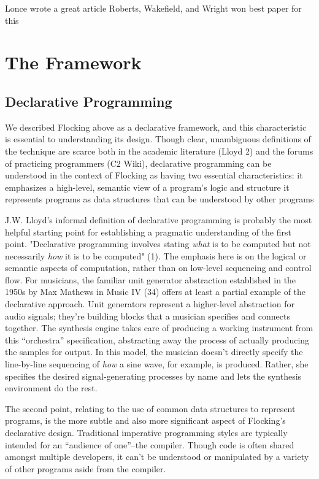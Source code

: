 \documentclass{article}
\begin{document}
Lonce wrote a great article \cite{DBLP:journals/comj/WyseS13}
Roberts, Wakefield, and Wright won best paper for this \cite{roberts_web_2013}


\section{The Framework}

\subsection{Declarative Programming}
We described Flocking above as a declarative framework, and this characteristic is essential to understanding its design. Though clear, unambiguous definitions of the technique are scarce both in the academic literature (Lloyd 2) and the forums of practicing programmers (C2 Wiki), declarative programming can be understood in the context of Flocking as having two essential characteristics:
it emphasizes a high-level, semantic view of a program’s logic and structure
it represents programs as data structures that can be understood by other programs

J.W. Lloyd's informal definition of declarative programming is probably the most helpful starting point for establishing a pragmatic understanding of the first point. "Declarative programming involves stating {\it what} is to be computed but not necessarily {\it how} it is to be computed" (1). The emphasis here is on the logical or semantic aspects of computation, rather than on low-level sequencing and control flow. For musicians, the familiar unit generator abstraction established in the 1950s by Max Mathews in Music IV (34) offers at least a partial example of the declarative approach. Unit generators represent a higher-level abstraction for audio signals; they're building blocks that a musician specifies and connects together. The synthesis engine takes care of producing a working instrument from this “orchestra” specification, abstracting away the process of actually producing the samples for output. In this model, the musician doesn't directly specify the line-by-line sequencing of {\it how} a sine wave, for example, is produced. Rather, she specifies the desired signal-generating processes by name and lets the synthesis environment do the rest.

The second point, relating to the use of common data structures to represent programs, is the more subtle and also more significant aspect of Flocking’s declarative design. Traditional imperative programming styles are typically intended for an “audience of one”--the compiler. Though code is often shared amongst multiple developers, it can’t be understood or manipulated by a variety of other programs aside from the compiler.
\end{document}
